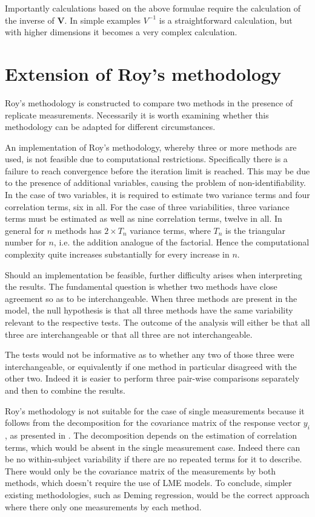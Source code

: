 \documentclass[12pt, a4paper]{report}
\theoremstyle{plain}
\theoremstyle{definition}
\theoremstyle{remark}
\begin{document}
Importantly calculations based on the above formulae require the
calculation of the inverse of \textbf{V}. In simple examples
$V^{-1}$ is a straightforward calculation, but with higher
dimensions it becomes a very complex calculation.




\section{Extension of Roy's methodology}
Roy's methodology is constructed to compare two methods in the presence of replicate measurements. Necessarily it is worth examining whether this methodology can be adapted for different circumstances.

An implementation of Roy's methodology, whereby three or more methods are used, is not feasible due to computational restrictions. Specifically there is a failure to reach convergence before the iteration limit is reached. This may be due to the presence of additional variables, causing the problem of non-identifiability. In the case of two variables, it is required to estimate two variance terms and four correlation terms, six in all. For the case of three variabilities, three variance terms must be estimated as well as nine correlation terms, twelve in all. In general for $n$ methods has $2 \times T_{n}$ variance terms, where $T_n$ is the triangular number for $n$, i.e. the addition analogue of the factorial. Hence the computational complexity quite increases substantially for every increase in $n$.

Should an implementation be feasible, further difficulty arises when interpreting the results. The fundamental question is whether two methods have close agreement so as to be interchangeable. When three methods are present in the model, the null hypothesis is that all three methods have the same variability relevant to the respective tests. The outcome of the analysis will either be that all three are interchangeable or that all three are not interchangeable.

The tests would not be informative as to whether any two of those three were interchangeable, or equivalently if one method in particular disagreed with the other two. Indeed it is easier to perform three pair-wise comparisons separately and then to combine the results.

Roy's methodology is not suitable for the case of single measurements because it follows from the decomposition for the covariance matrix of the response vector $y_{i}$, as presented in \citet{hamlett}. The decomposition depends on the estimation of correlation terms, which would be absent in the single measurement case. Indeed there can be no within-subject variability if there are no repeated terms for it to describe. There would only be the covariance matrix of the measurements by both methods, which doesn't require the use of LME models. To conclude, simpler existing methodologies, such as Deming regression, would be the correct approach where there only one measurements by each method.
\end{document}
